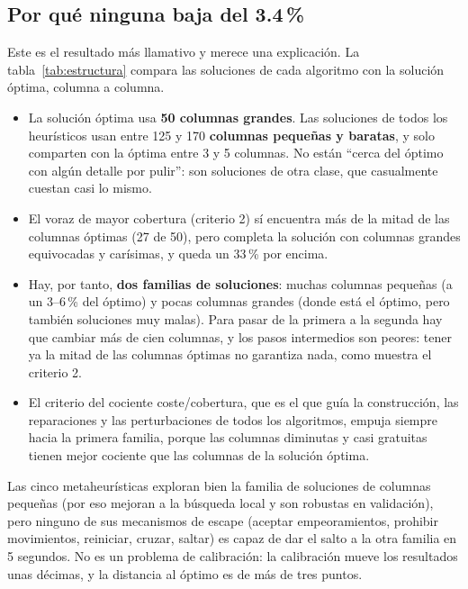 \subsection{Por qué ninguna baja del 3.4\,\%}\label{sec:barrera}

Este es el resultado más llamativo y merece una explicación. La tabla~\ref{tab:estructura}
compara las soluciones de cada algoritmo con la solución óptima, columna a columna.



\begin{itemize}
  \item La solución óptima usa \textbf{50 columnas grandes}. Las soluciones de todos los
        heurísticos usan entre 125 y 170 \textbf{columnas pequeñas y baratas}, y solo
        comparten con la óptima entre 3 y 5 columnas. No están ``cerca del óptimo con algún
        detalle por pulir'': son soluciones de otra clase, que casualmente cuestan casi lo
        mismo.
  \item El voraz de mayor cobertura (criterio 2) sí encuentra más de la mitad de las columnas
        óptimas (27 de 50), pero completa la solución con columnas grandes equivocadas y
        carísimas, y queda un 33\,\% por encima.
  \item Hay, por tanto, \textbf{dos familias de soluciones}: muchas columnas pequeñas (a un
        3--6\,\% del óptimo) y pocas columnas grandes (donde está el óptimo, pero también
        soluciones muy malas). Para pasar de la primera a la segunda hay que cambiar más de
        cien columnas, y los pasos intermedios son peores: tener ya la mitad de las columnas
        óptimas no garantiza nada, como muestra el criterio 2.
  \item El criterio del cociente coste/cobertura, que es el que guía la construcción, las
        reparaciones y las perturbaciones de todos los algoritmos, empuja siempre hacia la
        primera familia, porque las columnas diminutas y casi gratuitas tienen mejor
        cociente que las columnas de la solución óptima.
\end{itemize}

\begin{idea}[Interpretación]
Las cinco metaheurísticas exploran bien la familia de soluciones de columnas pequeñas (por
eso mejoran a la búsqueda local y son robustas en validación), pero ninguno de sus
mecanismos de escape (aceptar empeoramientos, prohibir movimientos, reiniciar, cruzar,
saltar) es capaz de dar el salto a la otra familia en 5 segundos. No es un problema de
calibración: la calibración mueve los resultados unas décimas, y la distancia al óptimo es
de más de tres puntos.
\end{idea}

